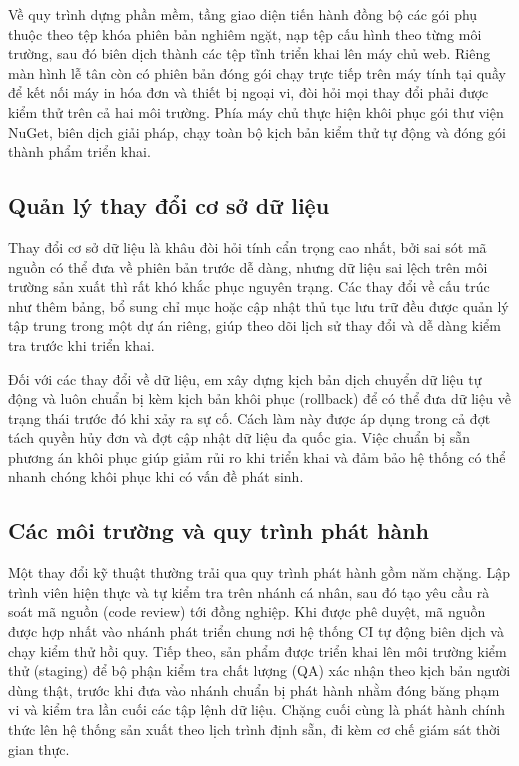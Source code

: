 Về quy trình dựng phần mềm, tầng giao diện tiến hành đồng bộ các gói phụ thuộc theo tệp khóa phiên bản nghiêm ngặt, nạp tệp cấu hình theo từng môi trường, sau đó biên dịch thành các tệp tĩnh triển khai lên máy chủ web. Riêng màn hình lễ tân còn có phiên bản đóng gói chạy trực tiếp trên máy tính tại quầy để kết nối máy in hóa đơn và thiết bị ngoại vi, đòi hỏi mọi thay đổi phải được kiểm thử trên cả hai môi trường. Phía máy chủ thực hiện khôi phục gói thư viện NuGet, biên dịch giải pháp, chạy toàn bộ kịch bản kiểm thử tự động và đóng gói thành phẩm triển khai.

\subsection{Quản lý thay đổi cơ sở dữ liệu}

Thay đổi cơ sở dữ liệu là khâu đòi hỏi tính cẩn trọng cao nhất, bởi sai sót mã nguồn có thể đưa về phiên bản trước dễ dàng, nhưng dữ liệu sai lệch trên môi trường sản xuất thì rất khó khắc phục nguyên trạng. Các thay đổi về cấu trúc như thêm bảng, bổ sung chỉ mục hoặc cập nhật thủ tục lưu trữ đều được quản lý tập trung trong một dự án riêng, giúp theo dõi lịch sử thay đổi và dễ dàng kiểm tra trước khi triển khai.

Đối với các thay đổi về dữ liệu, em xây dựng kịch bản dịch chuyển dữ liệu tự động và luôn chuẩn bị kèm kịch bản khôi phục (rollback) để có thể đưa dữ liệu về trạng thái trước đó khi xảy ra sự cố. Cách làm này được áp dụng trong cả đợt tách quyền hủy đơn và đợt cập nhật dữ liệu đa quốc gia. Việc chuẩn bị sẵn phương án khôi phục giúp giảm rủi ro khi triển khai và đảm bảo hệ thống có thể nhanh chóng khôi phục khi có vấn đề phát sinh.

\subsection{Các môi trường và quy trình phát hành}

Một thay đổi kỹ thuật thường trải qua quy trình phát hành gồm năm chặng. Lập trình viên hiện thực và tự kiểm tra trên nhánh cá nhân, sau đó tạo yêu cầu rà soát mã nguồn (code review) tới đồng nghiệp. Khi được phê duyệt, mã nguồn được hợp nhất vào nhánh phát triển chung nơi hệ thống CI tự động biên dịch và chạy kiểm thử hồi quy. Tiếp theo, sản phẩm được triển khai lên môi trường kiểm thử (staging) để bộ phận kiểm tra chất lượng (QA) xác nhận theo kịch bản người dùng thật, trước khi đưa vào nhánh chuẩn bị phát hành nhằm đóng băng phạm vi và kiểm tra lần cuối các tập lệnh dữ liệu. Chặng cuối cùng là phát hành chính thức lên hệ thống sản xuất theo lịch trình định sẵn, đi kèm cơ chế giám sát thời gian thực.

